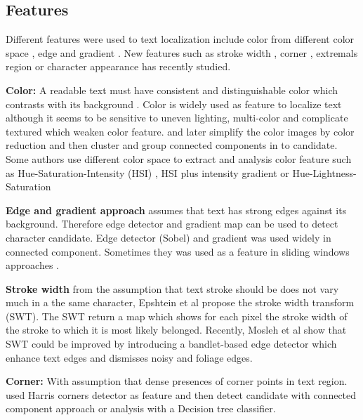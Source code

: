 \subsection{Features}


Different features were used to text localization include color from different color space \cite{yi.2012.TIP} \cite{Roubtsova.2012.SPIE}, edge and gradient \cite{39}. New features such as stroke width \cite{Subramanian.2007.ICDAR} \cite{Epshtein.2010.CVPR} , corner \cite{Zhao.2011.TIP}, extremals region \cite{Neumann.2011.ICDAR} \cite{xucheng.2013.pami} or character appearance \cite{Ye.2014.CBDAR} \cite{Yi.2013.CVIU} has recently studied.


\textbf{Color:} A readable text must have consistent and distinguishable color which contrasts with its background \cite{Liang.2005.IJDAR}. Color is widely used as feature to localize text \cite{Jain.1998.ICPR} \cite{Wang.2003.PR} \cite{Lee.2010.ICPR} although it seems to be sensitive to uneven lighting, multi-color and complicate textured which weaken color feature.
\cite{39} and later \cite{Nikolaou.2009.ISTI} simplify the color images by color reduction and then cluster and group connected components in to candidate. Some authors use different color space to extract and analysis color feature such as Hue-Saturation-Intensity (HSI) \cite{Garcia.2000.ICASSP}, HSI plus intensity gradient \cite{Neumann12} or Hue-Lightness-Saturation \cite{Karatzas.2004.ICPR}


\textbf{Edge and gradient approach} assumes that text has strong edges against its background. Therefore edge detector and gradient map can be used to detect character candidate. Edge detector \cite{Ye.2003.ICICS} (Sobel) \cite{Pillai.2013.ICCPCT} \cite{Shiva.2008.ICPR} and gradient was used widely in connected component. Sometimes they was used as a feature in sliding windows approaches \cite{Chen.2004.CVPR} \cite{Hanif.2008.ICPR}.


\textbf{Stroke width} from the assumption that text stroke should be does not vary much in a the same character, Epshtein et al \cite{Epshtein.2010.CVPR} propose the stroke width transform (SWT). The SWT return a map which shows for each pixel the stroke width of the stroke to which it is most likely belonged. Recently, Mosleh et al \cite{Mosleh.2012.BMVC} show that SWT could be improved by introducing a bandlet-based edge detector which enhance text edges and dismisses noisy and foliage edges.


\textbf{Corner: } With assumption that dense presences of corner points in text region. \cite{Zhao.2011.TIP} \cite{huang.2010.ICPR} used Harris corners detector as feature and then detect candidate with connected component approach \cite{huang.2010.ICPR} or analysis with a Decision tree classifier.


